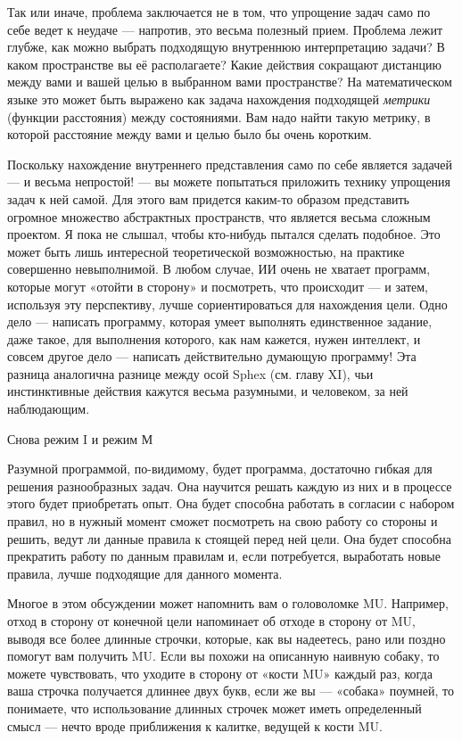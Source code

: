 \documentclass[../main.tex]{subfiles}
\begin{document}
Так или иначе, проблема заключается не в том, что упрощение задач само по себе ведет к неудаче --- напротив, это весьма полезный прием. Проблема лежит глубже, как можно выбрать подходящую внутреннюю интерпретацию задачи? В каком пространстве вы её располагаете? Какие действия сокращают дистанцию между вами и вашей целью в выбранном вами пространстве? На математическом языке это может быть выражено как задача нахождения подходящей \emph{метрики} (функции расстояния) между состояниями. Вам надо найти такую метрику, в которой расстояние между вами и целью было бы очень коротким.

Поскольку нахождение внутреннего представления само по себе является задачей --- и весьма непростой! --- вы можете попытаться приложить технику упрощения задач к ней самой. Для этого вам придется каким-то образом представить огромное множество абстрактных пространств, что является весьма сложным проектом. Я пока не слышал, чтобы кто-нибудь пытался сделать подобное. Это может быть лишь интересной теоретической возможностью, на практике совершенно невыполнимой. В любом случае, ИИ очень не хватает программ, которые могут «отойти в сторону» и посмотреть, что происходит --- и затем, используя эту перспективу, лучше сориентироваться для нахождения цели. Одно дело --- написать программу, которая умеет выполнять единственное задание, даже такое, для выполнения которого, как нам кажется, нужен интеллект, и совсем другое дело --- написать действительно думающую программу! Эта разница аналогична разнице между осой Sphex (см. главу XI), чьи инстинктивные действия кажутся весьма разумными, и человеком, за ней наблюдающим.

Снова режим I и режим М

Разумной программой, по-видимому, будет программа, достаточно гибкая для решения разнообразных задач. Она научится решать каждую из них и в процессе этого будет приобретать опыт. Она будет способна работать в согласии с набором правил, но в нужный момент сможет посмотреть на свою работу со стороны и решить, ведут ли данные правила к стоящей перед ней цели. Она будет способна прекратить работу по данным правилам и, если потребуется, выработать новые правила, лучше подходящие для данного момента.

Многое в этом обсуждении может напомнить вам о головоломке MU\@. Например, отход в сторону от конечной цели напоминает об отходе в сторону от MU, выводя все более длинные строчки, которые, как вы надеетесь, рано или поздно помогут вам получить MU\@. Если вы похожи на описанную наивную собаку, то можете чувствовать, что уходите в сторону от «кости MU» каждый раз, когда ваша строчка получается длиннее двух букв, если же вы --- «собака» поумней, то понимаете, что использование длинных строчек может иметь определенный смысл --- нечто вроде приближения к калитке, ведущей к кости MU.
\end{document}
